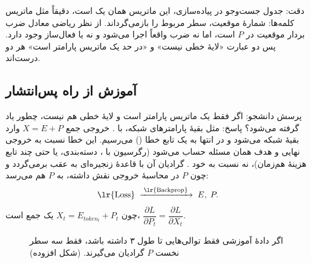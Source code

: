 \begin{correctionbox}{دقت: جدول جست‌وجو}
در پیاده‌سازی، این ماتریس همان یک  است، دقیقاً مثل ماتریس  کلمه‌ها: شمارهٔ موقعیت، سطر مربوط را بازمی‌گرداند. از نظر ریاضی معادل ضرب بردار  موقعیت در $P$ است، اما نه ضرب واقعاً اجرا می‌شود و نه  یا فعال‌ساز وجود دارد. پس دو عبارت «لایهٔ خطی نیست» و «در حد یک ماتریس پارامتر است» هر دو درست‌اند.
\end{correctionbox}

\subsection{آموزش از راه پس‌انتشار}
پرسش دانشجو: اگر فقط یک ماتریس پارامتر است و لایهٔ خطی هم نیست، چطور یاد گرفته می‌شود؟ پاسخ: مثل بقیهٔ پارامترهای شبکه، با . خروجی جمع $X=E+P$ وارد بقیهٔ شبکه می‌شود و در انتها به یک تابع خطا () می‌رسیم. این خطا نسبت به خروجی نهایی و هدف همان مسئله حساب می‌شود (رگرسیون با ، دسته‌بندی، یا حتی چند تابع هزینهٔ هم‌زمان)، نه نسبت به خود . گرادیان آن با قاعدهٔ زنجیره‌ای به عقب برمی‌گردد و چون $P$ در محاسبهٔ خروجی نقش داشته، به $P$ هم می‌رسد:
\[
\text{\lr{Loss}}\;\xrightarrow{\;\text{\lr{Backprop}}\;}\; E,\;P .
\]
چون $X_t=E_{token_t}+P_t$ یک جمع است، $\dfrac{\partial L}{\partial P_t}=\dfrac{\partial L}{\partial X_t}$.

\begin{figure}[htbp]
\centering
{}
\caption{اگر دادهٔ آموزشی فقط توالی‌هایی تا طول ۳ داشته باشد، فقط سه سطر نخست $P$ گرادیان می‌گیرند. (شکل افزوده)}
\end{figure}

